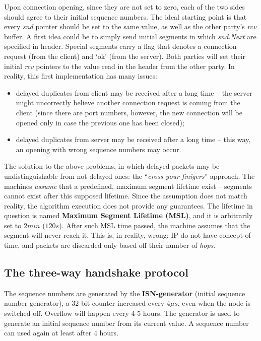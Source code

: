 \documentclass[10pt]{book}
\begin{document}
Upon connection opening, since they are not set to zero, each of the two sides
should agree to their initial sequence numbers. The ideal starting point is
that every \emph{snd} pointer should be set to the same value, as well as the
other party's \emph{rcv} buffer. A first idea could be to simply send initial
segments in which \emph{snd.Next} are specified in header. Special segments
carry a flag that denotes a connection request (from the client) and `ok' (from
the server). Both parties will set their initial \emph{rcv} pointers to the
value read in the header from the other party. In reality, this first
implementation has many issues:
\begin{itemize}
    \item delayed duplicates from client may be received after a long time \---
        the server might uncorrectly believe another connection request is
        coming from the client (since there are port numbers, however, the new
        connection will be opened only in case the previous one has been
        closed);
    \item delayed duplicates from server may be received after a long time \---
        this way, an opening with wrong sequence numbers may occur.
\end{itemize}

The solution to the above problems, in which delayed packets may be
undistinguishable from not delayed ones: the ``\emph{cross your finigers}''
approach. The machines \emph{assume} that a predefined, maximum segment
lifetime exist \--- segments cannot exist after this supposed lifetime. Since
the assumption does not match reality, the algorithm execution does not provide
any guarantees. The lifetime in question is named \textbf{Maximum Segment
Lifetime (MSL)}, and it is arbitrarily set to $2 min$ ($120s$). After such MSL
time passed, the machine assumes that the segment will never reach it. This is,
in reality, wrong: IP do not have concept of time, and packets are discarded
only based off their number of \emph{hops}. 

\subsection{The three-way handshake protocol}

The sequence numbers are generated by the \textbf{ISN-generator} (initial
sequence number generator), a $32$-bit counter increased every $4\mu s$, even
when the node is switched off. Overflow will happen every 4-5 hours. The
generator is used to generate an initial sequence number from its current
value. A sequence number can used again at least after $4$ hours.
\end{document}
